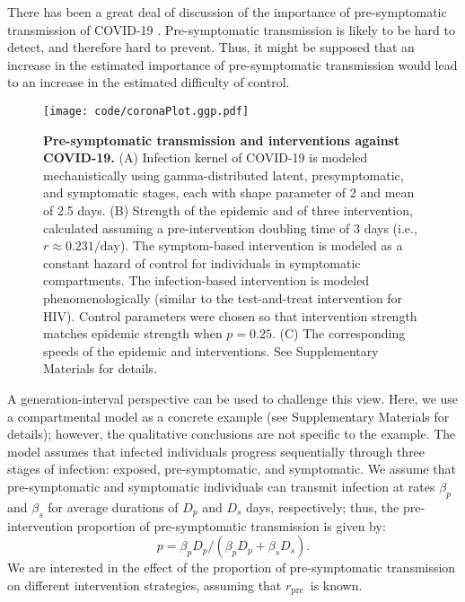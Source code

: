 \documentclass[12pt]{article}
\newcommand{\rr}{\ensuremath{{r}}}
\newcommand{\rx}[1]{\ensuremath{\rr_{\mathrm{#1}}}}
\newcommand{\rpre}{\rx{pre}}
\newcommand{\figlab}[1]{\label{fig:#1}}
\begin{document}
There has been a great deal of discussion of the importance of pre-symptomatic transmission of COVID-19 \cite{ferretti2020quantifying, he2020temporal, hellewell2020feasibility}. 
Pre-symptomatic transmission is likely to be hard to detect, and therefore hard to prevent. 
Thus, it might be supposed that an increase in the estimated importance of pre-symptomatic transmission would lead to an increase in the estimated difficulty of control.

\begin{figure}[!th]
\texttt{[image: code/coronaPlot.ggp.pdf]}
\caption{
\textbf{Pre-symptomatic transmission and interventions against COVID-19.}
(A) Infection kernel of COVID-19 is modeled mechanistically using gamma-distributed latent, presymptomatic, and symptomatic stages, each with shape parameter of 2 and mean of 2.5 days.
(B) Strength of the epidemic and of three intervention, calculated assuming a pre-intervention doubling time of 3 days (i.e., $r \approx 0.231/\mathrm{day}$).
The symptom-based intervention is modeled as a constant hazard of control for individuals in symptomatic compartments.
The infection-based intervention is modeled phenomenologically (similar to the test-and-treat intervention for HIV).
Control parameters were chosen so that intervention strength matches epidemic strength when $p=0.25$.
(C) The corresponding speeds of the epidemic and interventions. 
See Supplementary Materials for details.
}
\figlab{covid}
\end{figure}

A generation-interval perspective \cite{park2019practical} can be used to challenge this view.
Here, we use a compartmental model as a concrete example (see Supplementary Materials for details); however, the qualitative conclusions are not specific to the example.
The model assumes that infected individuals progress sequentially through three stages of infection: exposed, pre-symptomatic, and symptomatic.
We assume that pre-symptomatic and symptomatic individuals can transmit infection at rates $\beta_p$ and $\beta_s$ for average durations of $D_p$ and $D_s$ days, respectively;
thus, the pre-intervention proportion of pre-symptomatic transmission is given by:
\begin{equation}
p=\beta_p D_p/(\beta_p D_p + \beta_s  D_s).
\end{equation}
We are interested in the effect of the proportion of pre-symptomatic transmission on different intervention strategies, assuming that \rpre\ is known.
\end{document}
